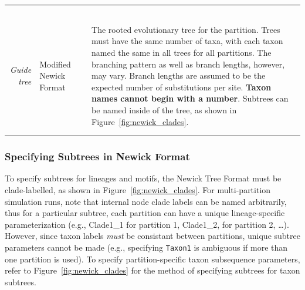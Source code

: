 \documentclass[10pt]{article}
\begin{document}
\begin{small}
\begin{ThreePartTable}
\begin{longtable}{p{2cm}p{5.5cm}p{0.8cm}p{7cm}}
{$$ }\\
\\
 \multicolumn{1}{r}{\it Guide tree}          & Modified Newick Format && The rooted evolutionary tree for the partition. Trees must have the same number of taxa, with each taxon named the same in all trees for all partitions. The branching pattern as well as branch lengths, however, may vary. Branch lengths are assumed to be the expected number of substitutions per site. {\bf Taxon names cannot begin with a number}. Subtrees can be named inside of the tree, as shown in Figure~\ref{fig:newick_clades}.\\ \\
\hline
\label{tab:options}
\end{longtable}
\end{ThreePartTable}
\end{small}

 \subsubsection{Specifying Subtrees in Newick Format}

 To specify subtrees for lineages and motifs, the Newick Tree Format must be clade-labelled, as shown in Figure~\ref{fig:newick_clades}. For multi-partition simulation runs, note that internal node clade labels can be named arbitrarily, thus for a particular subtree, each partition can have a unique lineage-specific parameterization (e.g., Clade1\_1 for partition 1, Clade1\_2, for partition 2, \ldots). However, since taxon labels \emph{must} be consistant between partitions, unique subtree parameters cannot be made (e.g., specifying {\tt Taxon1} is ambiguous if more than one partition is used). To specify partition-specific taxon subsequence parameters, refer to Figure~\ref{fig:newick_clades} for the method of specifying subtrees for taxon subtrees.
\end{document}
